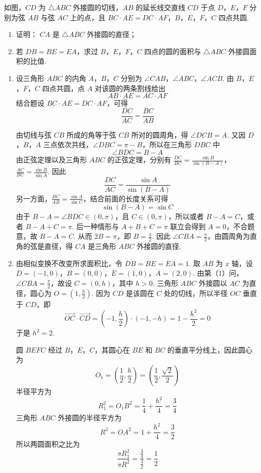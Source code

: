 \begin{problem}
如图，\(CD\) 为 \(\triangle ABC\) 外接圆的切线，\(AB\) 的延长线交直线 \(CD\) 于点 \(D\)，\(E\)，\(F\) 分别为弦 \(AB\) 与弦 \(AC\) 上的点，且 \(BC \cdot AE = DC \cdot AF\)，\(B\)，\(E\)，\(F\)，\(C\) 四点共圆.

\begin{enumerate}
\item 证明： \(CA\) 是 \(\triangle ABC\) 外接圆的直径；
\item 若 \(DB = BE = EA\)，求过 \(B\)，\(E\)，\(F\)，\(C\) 四点的圆的面积与 \(\triangle ABC\) 外接圆面积的比值.
\end{enumerate}

\end{problem}

\begin{solution}
\begin{enumerate}
\item 设三角形 \(ABC\) 的内角 \(A\)，\(B\)，\(C\) 分别为 \(\angle CAB\)，\(\angle ABC\)，\(\angle ACB\). 由 \(B\)，\(E\)，\(F\)，\(C\) 四点共圆，点 \(A\) 对该圆的两条割线给出
\[
AB\cdot AE=AC\cdot AF
\]
结合题设 \(BC\cdot AE=DC\cdot AF\)，可得
\[
\frac{DC}{AC}=\frac{BC}{AB}
\]

由切线与弦 \(CB\) 所成的角等于弦 \(CB\) 所对的圆周角，得 \(\angle DCB=A\). 又因 \(D\)，\(B\)，\(A\) 三点依次共线，\(\angle DBC=\pi-B\)，所以在三角形 \(DBC\) 中
\[
\angle BDC=B-A
\]
由正弦定理以及三角形 \(ABC\) 的正弦定理，分别有 \(\frac{DC}{BC}=\frac{\sin B}{\sin(B-A)}\)，\(\frac{AC}{BC}=\frac{\sin B}{\sin A}\).
因此
\[
\frac{DC}{AC}=\frac{\sin A}{\sin(B-A)}
\]
另一方面，\(\frac{BC}{AB}=\frac{\sin A}{\sin C}\)，结合前面的长度关系可得
\[
\sin(B-A)=\sin C
\]
由于 \(B-A=\angle BDC\in(0,\pi)\)，且 \(C\in(0,\pi)\)，所以或者 \(B-A=C\)，或者 \(B-A+C=\pi\). 后一种情形与 \(A+B+C=\pi\) 联立会得到 \(A=0\)，不合题意，故 \(B-A=C\). 从而 \(2B=\pi\)，即 \(B=\frac{\pi}{2}\). 因此 \(\angle CBA=\frac{\pi}{2}\)，由圆周角为直角的弦是直径，得 \(CA\) 是三角形 \(ABC\) 外接圆的直径.
\item 由相似变换不改变所求面积比，令 \(DB=BE=EA=1\). 取 \(AB\) 为 \(x\) 轴，设 \(D=(-1,0)\)，\(B=(0,0)\)，\(E=(1,0)\)，\(A=(2,0)\).
由第（1）问，\(\angle CBA=\frac{\pi}{2}\)，故设 \(C=(0,h)\)，其中 \(h>0\). 三角形 \(ABC\) 外接圆以 \(AC\) 为直径，圆心为 \(O=(1,\frac h2)\). 因为 \(CD\) 是该圆在 \(C\) 处的切线，所以半径 \(OC\) 垂直于 \(CD\)，即
\[
\overrightarrow{OC}\cdot\overrightarrow{CD}=\left(-1,\frac h2\right)\cdot\left(-1,-h\right)=1-\frac{h^2}{2}=0
\]
于是 \(h^2=2\).

圆 \(BEFC\) 经过 \(B\)，\(E\)，\(C\)，其圆心在 \(BE\) 和 \(BC\) 的垂直平分线上，因此圆心为
\[
O_1=\left(\frac12,\frac h2\right)=\left(\frac12,\frac{\sqrt2}{2}\right)
\]
半径平方为
\[
R_1^2=O_1B^2=\frac14+\frac{h^2}{4}=\frac34
\]
三角形 \(ABC\) 外接圆的半径平方为
\[
R^2=OA^2=1+\frac{h^2}{4}=\frac32
\]
所以两圆面积之比为
\[
\frac{\pi R_1^2}{\pi R^2}=\frac{\frac{3}{4}}{\frac{3}{2}}=\frac12
\]
\end{enumerate}
\end{solution}

